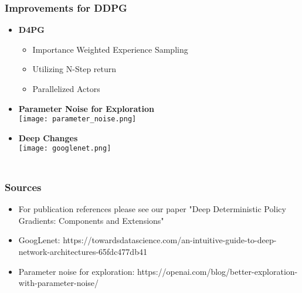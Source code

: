 \documentclass[accentcolor=tud1d,colorbacktitle,inverttitle,landscape,german,presentation,t]{tudbeamer}
\begin{document}
	\begin{frame}
		\frametitle{\\Improvements for DDPG}
		\begin{itemize}
			\item \textbf{D4PG}
			\begin{itemize}
				\item Importance Weighted Experience Sampling
				\item Utilizing N-Step return
				\item Parallelized Actors
			\end{itemize}
		\end{itemize}
		\begin{multicols}{2}
			\begin{itemize}
				\item \textbf{Parameter Noise for Exploration}
				\\
				\hspace*{0.5 cm}\texttt{[image: parameter\_noise.png]}
				\item \textbf{Deep Changes}
				\\
				\vspace*{0.5cm}\texttt{[image: googlenet.png]} 
			\end{itemize}
		\end{multicols}
	\end{frame}
	\begin{frame}
		\frametitle{\\Sources}
		\begin{itemize}
			\item For publication references please see our paper "Deep Deterministic Policy Gradients: Components and Extensions"
			\item GoogLenet: https://towardsdatascience.com/an-intuitive-guide-to-deep-network-architectures-65fdc477db41
			\item Parameter noise for exploration:
			https://openai.com/blog/better-exploration-with-parameter-noise/			
		\end{itemize}

	\end{frame}
\end{document}
